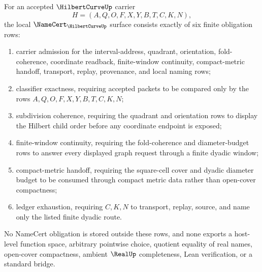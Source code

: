 \begin{theorem}
\label{thm:hilbert-curve-namecert-obligations}
For an accepted $\HilbertCurveUp$ carrier
$$
H=(A,Q,O,F,X,Y,B,T,C,K,N),
$$
the local $\NameCert_{\HilbertCurveUp}$ surface consists exactly of six finite obligation rows:
\begin{enumerate}
\item carrier admission for the interval-address, quadrant, orientation, fold-coherence, coordinate readback, finite-window continuity, compact-metric handoff, transport, replay, provenance, and local naming rows;
\item classifier exactness, requiring accepted packets to be compared only by the rows $A,Q,O,F,X,Y,B,T,C,K,N$;
\item subdivision coherence, requiring the quadrant and orientation rows to display the Hilbert child order before any coordinate endpoint is exposed;
\item finite-window continuity, requiring the fold-coherence and diameter-budget rows to answer every displayed graph request through a finite dyadic window;
\item compact-metric handoff, requiring the square-cell cover and dyadic diameter budget to be consumed through compact metric data rather than open-cover compactness;
\item ledger exhaustion, requiring $C,K,N$ to transport, replay, source, and name only the listed finite dyadic route.
\end{enumerate}
No NameCert obligation is stored outside these rows, and none exports a host-level function space, arbitrary pointwise choice, quotient equality of real names, open-cover compactness, ambient $\RealUp$ completeness, Lean verification, or a standard bridge.
\end{theorem}

